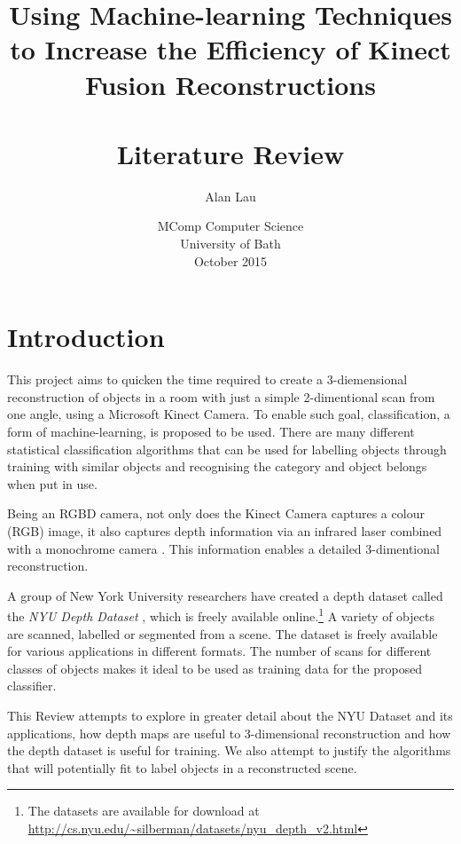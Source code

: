 \documentclass[11pt,openright,a4paper]{report}
\title{
  Using Machine-learning Techniques to Increase the Efficiency of Kinect Fusion Reconstructions
  \\~\\
  \textbf{Literature Review}
}
\author{Alan Lau}
\date{MComp Computer Science\\University of Bath\\October 2015}
\begin{document}

\maketitle
\newpage

\tableofcontents
\newpage

\setcounter{page}{1}

\setlength{\parindent}{0pt}
\setlength{\parskip}{\baselineskip}

\chapter{Introduction}
This project aims to quicken the time required to create a 3-diemensional reconstruction of objects in a room with just a simple 2-dimentional scan from one angle, using a Microsoft Kinect Camera. To enable such goal, classification, a form of machine-learning, is proposed to be used. There are many different statistical classification algorithms that can be used for labelling objects through training with similar objects and recognising the category and object belongs when put in use. 

Being an RGBD camera, not only does the Kinect Camera captures a colour (RGB) image, it also captures depth information via an infrared laser combined with a monochrome camera \cite{kinect-doc}. This information enables a detailed 3-dimentional reconstruction.

A group of New York University researchers have created a depth dataset called the \textit{NYU Depth Dataset} \cite{nyu-dataset}, which is freely available online.\footnote{The datasets are available for download at \url{http://cs.nyu.edu/~silberman/datasets/nyu_depth_v2.html}} A variety of objects are scanned, labelled or segmented from a scene. The dataset is freely available for various applications in different formats. The number of scans for different classes of objects makes it ideal to be used as training data for the proposed classifier. 

This Review attempts to explore in greater detail about the NYU Dataset and its applications, how depth maps are useful to 3-dimensional reconstruction and how the depth dataset is useful for training. We also attempt to justify the algorithms that will potentially fit to label objects in a reconstructed scene.

\newpage
\end{document}
